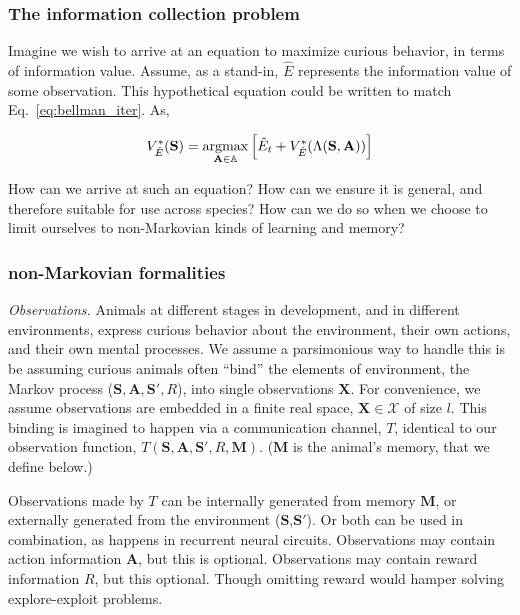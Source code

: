 \subsubsection*{The information collection problem}
Imagine we wish to arrive at an equation to maximize curious behavior, in terms of information value. Assume, as a stand-in, $\hat E$ represents the information value of some observation. This hypothetical equation could be written to match Eq.~\ref{eq:bellman_iter}. As,

\begin{equation} 
	\label{eq:bellman_iter_E}
	V^*_{\hat E}(\mathbf{S}) = \operatorname*{argmax}_{\mathbf{A} \in \mathbb{A}} \Big [ \hat E_{t}  + V^*_{\hat E}(\Lambda(\mathbf{S},\mathbf{A})) \Big ]
\end{equation}

How can we arrive at such an equation? How can we ensure it is general, and therefore suitable for use across species? How can we do so when we choose to limit ourselves to non-Markovian kinds of learning and memory? 

\subsubsection*{non-Markovian formalities}
\emph{Observations.} Animals at different stages in development, and in different environments, express curious behavior about the environment, their own actions, and their own mental processes. We assume a parsimonious way to handle this is be assuming curious animals often ``bind'' \cite{Robertson2003} the elements of environment, the Markov process ($\mathbf{S},\mathbf{A},\mathbf{S'},R$), into single observations $\mathbf{X}$. For convenience, we assume observations are embedded in a finite real space, $\mathbf{X} \in \mathcal{X}$ of size $l$. This binding is imagined to happen via a communication channel, $T$, identical to our observation function, $T(\mathbf{S},\mathbf{A},\mathbf{S'},R,\mathbf{M})$. ($\mathbf{M}$ is the animal's memory, that we define below.)

Observations made by $T$ can be internally generated from memory $\mathbf{M}$, or externally generated from the environment ($\mathbf{S}$,$\mathbf{S'}$). Or both can be used in combination, as happens in recurrent neural circuits. Observations may contain action information $\mathbf{A}$, but this is optional. Observations may contain reward information $R$, but this optional. Though omitting reward would hamper solving explore-exploit problems. 

